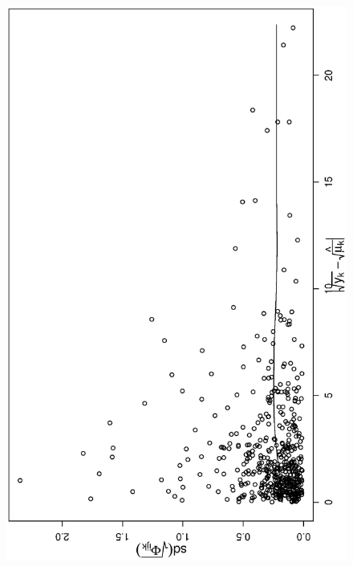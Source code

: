 \documentclass[11pt, fleqn]{article}
\begin{document}

\begin{figure}[t]
\begin{center}
\begin{minipage}{8cm}
\includegraphics[scale=0.3, angle=-90]{pic/hu_mean_sd_all_sigmai_tran.ps}

\end{minipage}
\end{center}
\end{figure}
\end{document}
